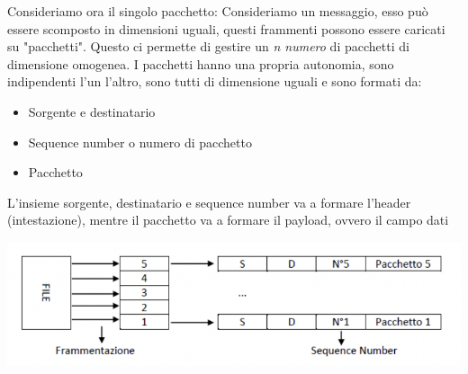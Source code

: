 \documentclass[11pt, oneside]{article}   	%
\begin{document}
Consideriamo ora il singolo pacchetto:
Consideriamo un messaggio, esso può essere scomposto in dimensioni uguali, questi frammenti possono essere caricati su "pacchetti". Questo ci permette di gestire un \emph{n numero} di pacchetti di dimensione omogenea. 
I pacchetti hanno una propria autonomia, sono indipendenti l'un l'altro, sono tutti di dimensione uguali e sono formati da:
\begin{itemize}
\item Sorgente e destinatario
\item Sequence number o numero di pacchetto
\item Pacchetto
\end{itemize}
L'insieme sorgente, destinatario e sequence number va a formare l'header (intestazione), mentre il pacchetto va a formare il payload, ovvero il campo dati\\
\begin{center}
\includegraphics[scale=0.6]{package}
\end{center}
\end{document}
